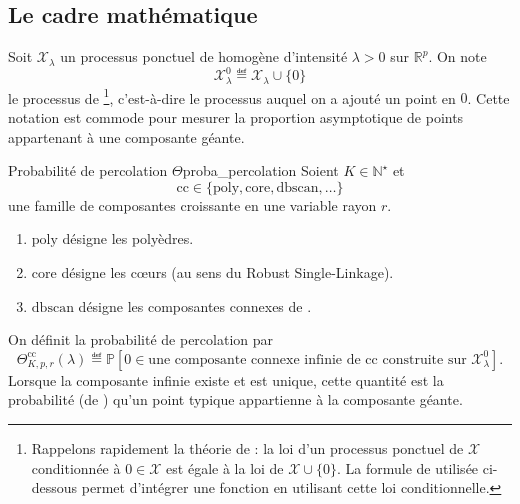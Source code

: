 \subsection{Le cadre mathématique}

Soit $\mathcal X_\lambda$ un processus ponctuel de  \cite{BB} homogène d'intensité $\lambda>0$ sur $\mathbb R^p$. On note
\[
    \mathcal X_\lambda^0 \eqdef \mathcal X_\lambda\cup\{0\}
\]
le processus de \footnote{Rappelons rapidement la théorie de  \cite{BB} : la loi d'un processus ponctuel de  $\mathcal X$ conditionnée à $0 \in \mathcal X$ est égale à la loi de $\mathcal X \cup \{0\}$. La formule de  utilisée ci-dessous permet d'intégrer une fonction en utilisant cette loi conditionnelle.}, c'est-à-dire le processus auquel on a ajouté un point en $0$. Cette notation est commode pour mesurer la proportion asymptotique de points appartenant à une composante géante.

\begin{Definition}{Probabilité de percolation $\Theta$}{proba_percolation}
Soient $K\in\mathbb N^\star$ et
\[
    \mathrm{cc}\in\{\mathrm{poly},\mathrm{core},\mathrm{dbscan},\ldots\}
\]
une famille de composantes croissante en une variable rayon $r$. 
\begin{enumerate}
    \item $\mathrm{poly}$ désigne les polyèdres.
    \item $\mathrm{core}$ désigne les cœurs (au sens du Robust Single-Linkage).
    \item $\mathrm{dbscan}$ désigne les composantes connexes de \DBSCAN \cite{DBSCAN}.
\end{enumerate} 

On définit la probabilité de percolation par
\[
    \Theta^{\mathrm{cc}}_{K,p,r}(\lambda)
    \eqdef
    \mathbb P\left[
    0\in \text{une composante connexe infinie de }\mathrm{cc}
    \text{ construite sur }\mathcal X_\lambda^0
    \right].
\]
Lorsque la composante infinie existe et est unique, cette quantité est la probabilité (de ) qu'un point typique appartienne à la composante géante.
\end{Definition}

